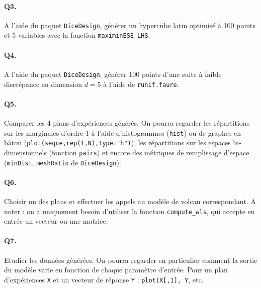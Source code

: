\documentclass[12pt]{scrartcl}
\begin{document}
\paragraph{Q3.} A l'aide du paquet \texttt{DiceDesign}, générer un hypercube latin optimisé à 100 points et 5 variables avec la fonction \texttt{maximinESE\_LHS}.

\paragraph{Q4.} A l'aide du paquet \texttt{DiceDesign}, générer 100 points d'une suite à faible discrépance en dimension $d=5$ à l'aide de \texttt{runif.faure}.

\paragraph{Q5.} Comparer les 4 plans d'expériences générés. 
On pourra regarder les répartitions sur les marginales d'ordre 1 à l'aide d'histogrammes (\texttt{hist}) ou de graphes en bâton (\texttt{plot(seqce,rep(1,N),type="h")}), 
les répartitions sur les espaces bi-dimensionnels (fonction \texttt{pairs}) et encore des métriques de remplissage d'espace (\texttt{minDist}, \texttt{meshRatio} de \texttt{DiceDesign}).

\paragraph{Q6.} Choisir un des plans et effectuer les appels au modèle de volcan correspondant. A noter : on a uniquement besoin d'utiliser la fonction \texttt{compute\_wls}, qui accepte en entrée un vecteur ou une matrice.

\paragraph{Q7.} Etudier les données générées. On pourra regarder en particulier comment la sortie du modèle varie en fonction de chaque paramètre d'entrée. 
Pour un plan d'expériences \texttt{X} et un vecteur de réponse \texttt{Y} : \texttt{plot(X[,1], Y}, etc.
\end{document}
